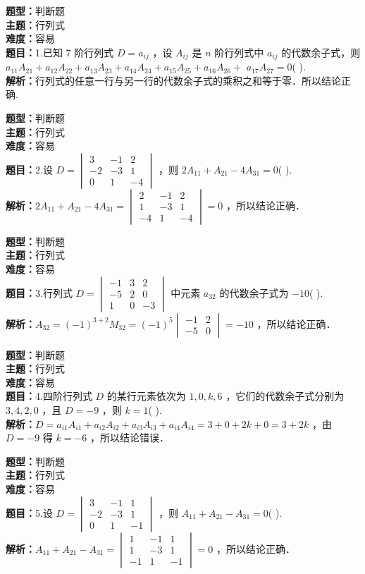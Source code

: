 \documentclass{ctexart}
\newenvironment{question}[5]{%
	\noindent\textbf{题型：}#1\\
	\textbf{主题：}#2\\
	\textbf{难度：}#3\\
	\textbf{题目：}#4\\
	\textbf{解析：}#5\\
	\vspace{1em}
}{}
\begin{document}
	\begin{question}
		{判断题}
		{行列式}
		{容易}
		{1.已知 7 阶行列式 \(D=a_{i j}\) ，设 \(A_{i j}\) 是 \(n\) 阶行列式中 \(a_{i j}\) 的代数余子式，则 \(a_{11} A_{21}+a_{12} A_{22}+a_{13} A_{23}+a_{14} A_{24}+a_{15} A_{25}+a_{16} A_{26}+\) \(a_{17} A_{27}=0\)(  ).}
		{行列式的任意一行与另一行的代数余子式的乘积之和等于零．所以结论正确.}
	\end{question}	
	
	\begin{question}
		{判断题}
		{行列式}
		{容易}
		{2.设 \(D=\begin{vmatrix}3 & -1 & 2 \\ -2 & -3 & 1 \\ 0 & 1 & -4\end{vmatrix}\) ，则 \(2 A_{11}+A_{21}-4 A_{31}=0\)(  ).}
		{\(2 A_{11}+A_{21}-4 A_{31}=\begin{vmatrix}2 & -1 & 2 \\ 1 & -3 & 1 \\ -4 & 1 & -4\end{vmatrix}=0\) ，所以结论正确．}
	\end{question}
	
	\begin{question}
		{判断题}
		{行列式}
		{容易}
		{3.行列式 \(D=\begin{vmatrix}-1 & 3 & 2 \\ -5 & 2 & 0 \\ 1 & 0 & -3\end{vmatrix}\) 中元素 \(a_{32}\) 的代数余子式为 \(-10\)(  ).}
		{\(A_{32}=(-1)^{3+2} M_{32}=(-1)^5 \begin{vmatrix}-1 & 2 \\ -5 & 0\end{vmatrix}=-10\) ，所以结论正确．}
	\end{question}
	
	\begin{question}
		{判断题}
		{行列式}
		{容易}
		{4.四阶行列式 \(D\) 的某行元素依次为 \(1,0,k,6\) ，它们的代数余子式分别为 \(3,4,2,0\) ，且 \(D=-9\) ，则 \(k=1\)(  ).}
		{\(D=a_{i1} A_{i1}+a_{i2} A_{i2}+a_{i3} A_{i3}+a_{i4} A_{i4}=3+0+2k+0=3+2k\) ，由 \(D=-9\) 得 \(k=-6\) ，所以结论错误．}
	\end{question}
	
	\begin{question}
		{判断题}
		{行列式}
		{容易}
		{5.设 \(D=\begin{vmatrix}3 & -1 & 1 \\ -2 & -3 & 1 \\ 0 & 1 & -1\end{vmatrix}\) ，则 \(A_{11}+A_{21}-A_{31}=0\)(  ).}
		{\(A_{11}+A_{21}-A_{31}=\begin{vmatrix}1 & -1 & 1 \\ 1 & -3 & 1 \\ -1 & 1 & -1\end{vmatrix}=0\) ，所以结论正确．}
	\end{question}
	
\end{document}
